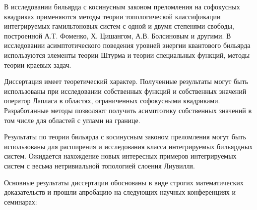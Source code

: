 %
%
{\methods} В исследовании бильярда с косинусным законом преломления на софокусных квадриках применяются методы теории топологической классификации интегрируемых гамильтоновых систем с одной и двумя степенями свободы, построенной А.Т. Фоменко, Х. Цишангом, А.В. Болсиновым и другими. В исследовании асимптотического поведения уровней энергии квантового бильярда используются элементы теории Штурма и теории специальных функций, методы теории краевых задач. 

{\influence} 
Диссертация имеет теоретический характер.
Полученные результаты могут быть использованы при исследовании собственных функций и собственных значений оператор Лапласа в областях, ограниченных софокусными квадриками.
Разработанные методы позволяют получить асимптотику собственных значений в том числе для областей с углами на границе.

Результаты по теории бильярда с косинусным законом преломления могут быть использованы для расширения и исследования класса интегрируемых бильярдных систем. Ожидается нахождение новых интересных примеров интегрируемых систем с весьма нетривиальной топологией слоения Лиувилля.


\bigskip
{\probation}
Основные результаты диссертации обоснованы в виде строгих математических доказательств и прошли апробацию на следующих научных конференциях и семинарах:

